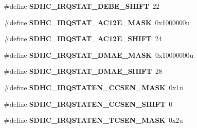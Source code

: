 \begin{DoxyCompactItemize}
\item 
\#define {\bfseries S\+D\+H\+C\+\_\+\+I\+R\+Q\+S\+T\+A\+T\+\_\+\+D\+E\+B\+E\+\_\+\+S\+H\+I\+FT}~22\hypertarget{group__SDHC__Register__Masks_gaca30553c1983afb6604acc0468a3a7b9}{}\label{group__SDHC__Register__Masks_gaca30553c1983afb6604acc0468a3a7b9}

\item 
\#define {\bfseries S\+D\+H\+C\+\_\+\+I\+R\+Q\+S\+T\+A\+T\+\_\+\+A\+C12\+E\+\_\+\+M\+A\+SK}~0x1000000u\hypertarget{group__SDHC__Register__Masks_gaa084b3a11c48abfe299e0f4dd5e6522c}{}\label{group__SDHC__Register__Masks_gaa084b3a11c48abfe299e0f4dd5e6522c}

\item 
\#define {\bfseries S\+D\+H\+C\+\_\+\+I\+R\+Q\+S\+T\+A\+T\+\_\+\+A\+C12\+E\+\_\+\+S\+H\+I\+FT}~24\hypertarget{group__SDHC__Register__Masks_gaa438836d215d57b0c6284879f9460161}{}\label{group__SDHC__Register__Masks_gaa438836d215d57b0c6284879f9460161}

\item 
\#define {\bfseries S\+D\+H\+C\+\_\+\+I\+R\+Q\+S\+T\+A\+T\+\_\+\+D\+M\+A\+E\+\_\+\+M\+A\+SK}~0x10000000u\hypertarget{group__SDHC__Register__Masks_gac96246ff1e63bd8572c8e5dbe9f0af38}{}\label{group__SDHC__Register__Masks_gac96246ff1e63bd8572c8e5dbe9f0af38}

\item 
\#define {\bfseries S\+D\+H\+C\+\_\+\+I\+R\+Q\+S\+T\+A\+T\+\_\+\+D\+M\+A\+E\+\_\+\+S\+H\+I\+FT}~28\hypertarget{group__SDHC__Register__Masks_ga00be94aaf735d641b66038501ab81c35}{}\label{group__SDHC__Register__Masks_ga00be94aaf735d641b66038501ab81c35}

\item 
\#define {\bfseries S\+D\+H\+C\+\_\+\+I\+R\+Q\+S\+T\+A\+T\+E\+N\+\_\+\+C\+C\+S\+E\+N\+\_\+\+M\+A\+SK}~0x1u\hypertarget{group__SDHC__Register__Masks_ga1ab5a76edc7d9d1b3458f6e111a47d29}{}\label{group__SDHC__Register__Masks_ga1ab5a76edc7d9d1b3458f6e111a47d29}

\item 
\#define {\bfseries S\+D\+H\+C\+\_\+\+I\+R\+Q\+S\+T\+A\+T\+E\+N\+\_\+\+C\+C\+S\+E\+N\+\_\+\+S\+H\+I\+FT}~0\hypertarget{group__SDHC__Register__Masks_gadbf850c08e3d0acfe9d03da53ac61b52}{}\label{group__SDHC__Register__Masks_gadbf850c08e3d0acfe9d03da53ac61b52}

\item 
\#define {\bfseries S\+D\+H\+C\+\_\+\+I\+R\+Q\+S\+T\+A\+T\+E\+N\+\_\+\+T\+C\+S\+E\+N\+\_\+\+M\+A\+SK}~0x2u\hypertarget{group__SDHC__Register__Masks_gac97f75c248571976edfb322bda13864e}{}\label{group__SDHC__Register__Masks_gac97f75c248571976edfb322bda13864e}


\end{DoxyCompactItemize}
